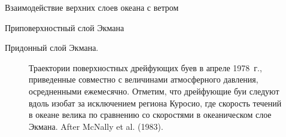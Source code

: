 \begin{chapter}{Взаимодействие верхних слоев океана с ветром}
\begin{section}{Приповерхностный слой Экмана}
\begin{paragraph}{Придонный слой Экмана.}
\begin{figure}[t!]
\caption{Траектории поверхностных дрейфующих 
буев в апреле 1978~г.,
приведенные совместно с величинами атмосферного давления, осредненными
ежемесячно. Отметим, что дрейфующие буи следуют вдоль изобат
за исключением региона Куросио,
где скорость течений в океане велика по сравнению со скоростями в океаническом
слое Экмана. After McNally et al. (1983).}
\label{fig:drifterplot}
\end{figure}
%
\end{paragraph}


\end{section}
\end{chapter}

